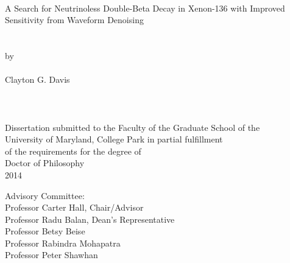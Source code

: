 
\thispagestyle{empty}
\hbox{\ }
\vspace{1in}
\renewcommand{\baselinestretch}{1}
\small\normalsize
\begin{center}

\large{{A Search for Neutrinoless Double-Beta Decay in Xenon-136 with Improved Sensitivity from Waveform Denoising}}\\
\ \\
\ \\
\large{by} \\
\ \\
\large{Clayton G. Davis}%
\ \\
\ \\
\ \\
\ \\
\normalsize
Dissertation submitted to the Faculty of the Graduate School of the \\
University of Maryland, College Park in partial fulfillment \\
of the requirements for the degree of \\
Doctor of Philosophy \\
2014
\end{center}

\vspace{7.5em}

\noindent Advisory Committee: \\
Professor Carter Hall, Chair/Advisor \\
Professor Radu Balan, Dean's Representative \\
Professor Betsy Beise \\
Professor Rabindra Mohapatra \\
Professor Peter Shawhan
